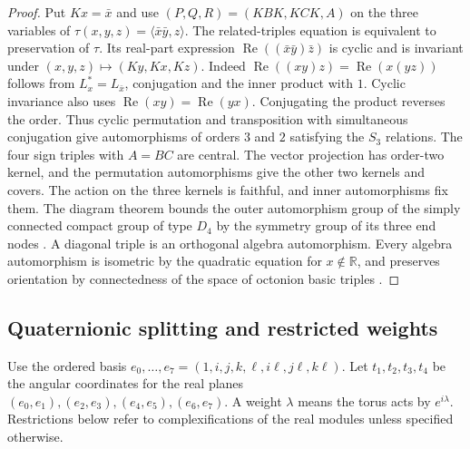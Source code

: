 \documentclass[aps,pra,onecolumn,superscriptaddress,nofootinbib,10pt]{revtex4-2}
\theoremstyle{definition}
\theoremstyle{remark}
\begin{document}
\begin{proof}
Put \(Kx=\bar x\) and use
\((P,Q,R)=(KBK,KCK,A)\) on the three variables of
\(\tau(x,y,z)=\langle\bar x\bar y,z\rangle\).
The related-triples equation is equivalent to preservation of
\(\tau\). Its real-part expression
\(\operatorname{Re}((\bar x\bar y)\bar z)\) is cyclic and is
invariant under \((x,y,z)\mapsto(Ky,Kx,Kz)\).
Indeed \(\operatorname{Re}((xy)z)=\operatorname{Re}(x(yz))\)
follows from \(L_x^*=L_{\bar x}\), conjugation and the inner
product with \(1\). Cyclic invariance also uses
\(\operatorname{Re}(xy)=\operatorname{Re}(yx)\). Conjugating the
product reverses the order. Thus cyclic permutation and
transposition with simultaneous conjugation give automorphisms
of orders \(3\) and \(2\) satisfying the \(S_3\) relations.
The four sign triples with \(A=BC\) are central.
The vector projection has order-two kernel, and the permutation
automorphisms give the other two kernels and covers. The action
on the three kernels is faithful, and inner automorphisms fix them.
The diagram theorem bounds the outer automorphism group of the
simply connected compact group of type \(D_4\) by the symmetry
group of its three end nodes \cite[\S2.4]{Baez}.
A diagonal triple is an orthogonal algebra automorphism. Every
algebra automorphism is isometric by the quadratic equation for
\(x\notin\mathbb R\), and preserves orientation by connectedness
of the space of octonion basic triples \cite[\S4.1]{Baez}.
\end{proof}

\subsection{Quaternionic splitting and restricted weights}\label{tr:weights}

Use the ordered basis \(e_0,\ldots,e_7=(1,i,j,k,\ell,i\ell,j\ell,k\ell)\).
Let \(t_1,t_2,t_3,t_4\) be the angular coordinates for the real
planes \((e_0,e_1),(e_2,e_3),(e_4,e_5),(e_6,e_7)\).
A weight \(\lambda\) means the torus acts by \(e^{i\lambda}\).
Restrictions below refer to complexifications of the real modules
unless specified otherwise.
\end{document}
